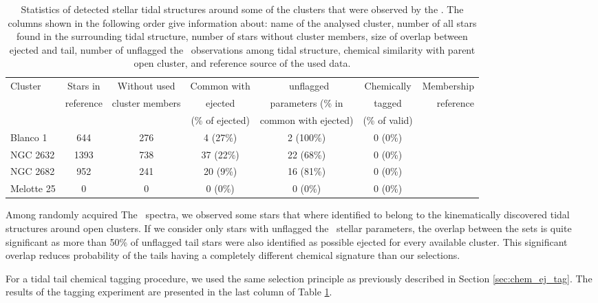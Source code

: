 \begin{table}
	\centering
	\caption{ Statistics of detected stellar tidal structures around some of the clusters that were observed by the \Gh. The columns shown in the following order give information about: name of the analysed cluster, number of all stars found in the surrounding tidal structure, number of stars without cluster members, size of overlap between ejected and tail, number of unflagged the \Gh\ observations among tidal structure, chemical similarity with parent open cluster, and reference source of the used data.}
	\begin{tabular}{l | c | c | c | c | c | r }
		\hline
		Cluster & Stars in & Without used & Common with & \Gh\ unflagged & Chemically & Membership\\
		& reference & cluster members & ejected & parameters (\% in & tagged & reference\\
		&  &  & (\% of ejected) & common with ejected) & (\% of valid) & \\
		\hline
		Blanco 1   & 644 & 276 & 4 (27\%) & 2 (100\%) & 0 (0\%) & \citet{2019arXiv191206657Z} \\
		NGC 2632   & 1393 & 738 & 37 (22\%) & 22 (68\%) & 0 (0\%) & \citet{2019AA...627A...4R} \\
		NGC 2682   & 952 & 241 & 20 (9\%) & 16 (81\%) & 0 (0\%) & \citet{2019AA...627A.119C} \\
		Melotte 25 & 0 & 0 & 0 (0\%) & 0 (0\%) & 0 (0\%) & \citet{2019AA...621L...3M} \\
		\hline
	\end{tabular}
	\label{tab:cluster_stats_tails}
\end{table}

Among randomly acquired The \Gh\ spectra, we observed some stars that where identified to belong to the kinematically discovered tidal structures around open clusters. If we consider only stars with unflagged the \Gh\ stellar parameters, the overlap between the sets is quite significant as more than 50\% of unflagged tail stars were also identified as possible ejected for every available cluster. This significant overlap reduces probability of the tails having a completely different chemical signature than our selections. 

For a tidal tail chemical tagging procedure, we used the same selection principle as previously described in Section \ref{sec:chem_ej_tag}. The results of the tagging experiment are presented in the last column of Table \ref{tab:cluster_stats_tails}. 

